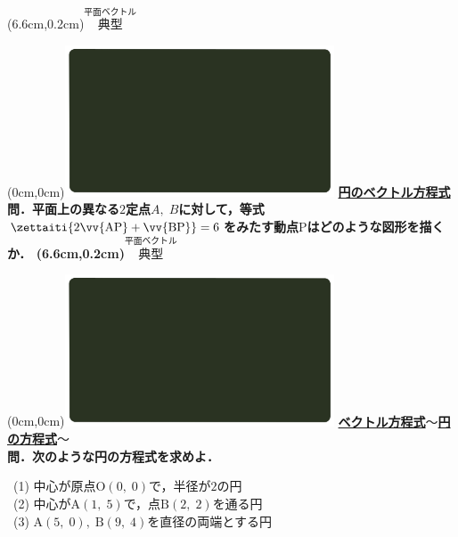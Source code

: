 \documentclass[10pt,
fleqn,
dvipdfmx,
uplatex
]{jsarticle}
\begin{document}
\at(6.6cm,0.2cm){\small\color{bradorange}$\overset{\text{平面ベクトル}}{\text{典型}}$}


\newpage



\at(0cm,0cm){\includegraphics[width=8cm,bb=0 0 1920 1080]{./media_local/smart_background/平面ベクトル.jpeg}}
{\color{orange}\bf\boldmath\LARGE\underline{円のベクトル方程式}}\vspace{0.3zw}\\
\Large 
\bf\boldmath 問．平面上の異なる$2$定点$A,\;B$に対して，等式$\zettaiti{2\vv {\text{AP}}+\vv {\text{BP}}}=6$をみたす動点$\text{P}$はどのような図形を描くか．
\at(6.6cm,0.2cm){\small\color{bradorange}$\overset{\text{平面ベクトル}}{\text{典型}}$}


\newpage



\at(0cm,0cm){\includegraphics[width=8cm,bb=0 0 1920 1080]{./media_local/smart_background/平面ベクトル.jpeg}}
{\color{orange}\bf\boldmath\large\underline{ベクトル方程式$〜$円の方程式$〜$}}\vspace{0.5zw}\\
\large 
\bf\boldmath 問．次のような円の方程式を求めよ．

\vspace{0.8zw}
\normalsize 
\ (1)  中心が原点$\text{O}\left(0,\;0\right)$で，半径が$2$の円\\
\ (2)  中心が$\text{A}\left(1,\;5\right)$で，点$\text{B}\left(2,\;2\right)$を通る円\\
\ (3)  $\text{A}\left(5,\;0\right),\;\text{B}\left(9,\;4\right)$を直径の両端とする円\\
\end{document}

